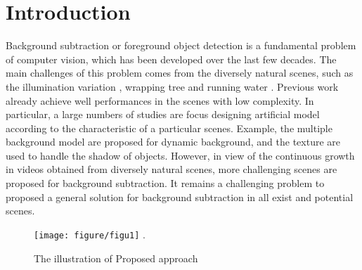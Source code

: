 \documentclass[journal]{IEEEtran}
\begin{document}
\section{Introduction}
Background subtraction or foreground object detection is a fundamental problem of computer vision, 
which has been developed over the last few decades.
The main challenges of this problem comes from the diversely natural scenes,
such as the illumination variation \cite{2017_REVIEW_7914756}, wrapping tree \cite{2014_CVIU_SOBRAL20144} and running water \cite{Bouwmans2014}.
Previous work already achieve well performances in the scenes with low complexity.
In particular,
a large numbers of studies are focus designing artificial model according to the characteristic of a particular scenes.
Example, the multiple background model are proposed for dynamic background,
and the texture are used to handle the shadow of objects.
However, in view of the continuous growth in videos obtained from diversely natural scenes,
more challenging scenes are proposed for background subtraction.
It remains a challenging problem to proposed a general solution for background subtraction in all exist and potential scenes.
%
% 
% 
% 
% 
\begin{figure}[!t]	%
\centering
\texttt{[image: figure/figu1]}
\DeclareGraphicsExtensions.
    \caption{The illustration of Proposed approach}
\label{fig_FBMS_nobk}
\end{figure}


\end{document}
